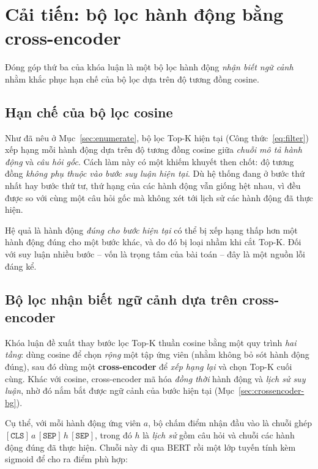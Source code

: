 \section{Cải tiến: bộ lọc hành động bằng cross-encoder}
\label{sec:crossencoder}

Đóng góp thứ ba của khóa luận là một bộ lọc hành động \emph{nhận biết ngữ cảnh} nhằm khắc phục hạn
chế của bộ lọc dựa trên độ tương đồng cosine.

\subsection{Hạn chế của bộ lọc cosine}
\label{sec:cosine-limit}

Như đã nêu ở Mục~\ref{sec:enumerate}, bộ lọc Top-K hiện tại (Công thức~\eqref{eq:filter}) xếp hạng
mỗi hành động dựa trên độ tương đồng cosine giữa \emph{chuỗi mô tả hành động} và \emph{câu hỏi gốc}.
Cách làm này có một khiếm khuyết then chốt: độ tương đồng \emph{không phụ thuộc vào bước suy luận
hiện tại}. Dù hệ thống đang ở bước thứ nhất hay bước thứ tư, thứ hạng của các hành động vẫn giống hệt
nhau, vì đều được so với cùng một câu hỏi gốc mà không xét tới lịch sử các hành động đã thực hiện.

Hệ quả là hành động \emph{đúng cho bước hiện tại} có thể bị xếp hạng thấp hơn một hành động đúng cho
một bước khác, và do đó bị loại nhầm khi cắt Top-K. Đối với suy luận nhiều bước -- vốn là trọng tâm
của bài toán -- đây là một nguồn lỗi đáng kể.

\subsection{Bộ lọc nhận biết ngữ cảnh dựa trên cross-encoder}
\label{sec:ce-filter}

Khóa luận đề xuất thay bước lọc Top-K thuần cosine bằng một quy trình \emph{hai tầng}: dùng cosine
để chọn \emph{rộng} một tập ứng viên (nhằm không bỏ sót hành động đúng), sau đó dùng một
\textbf{cross-encoder} để \emph{xếp hạng lại} và chọn Top-K cuối cùng. Khác với cosine, cross-encoder
mã hóa \emph{đồng thời} hành động và \emph{lịch sử suy luận}, nhờ đó nắm bắt được ngữ cảnh của bước
hiện tại (Mục~\ref{sec:crossencoder-bg}).

Cụ thể, với mỗi hành động ứng viên $a$, bộ chấm điểm nhận đầu vào là chuỗi ghép
$[\mathtt{CLS}]\,a\,[\mathtt{SEP}]\,h\,[\mathtt{SEP}]$, trong đó $h$ là \emph{lịch sử} gồm câu hỏi
và chuỗi các hành động đúng đã thực hiện. Chuỗi này đi qua BERT rồi một lớp tuyến tính kèm sigmoid để
cho ra điểm phù hợp:

